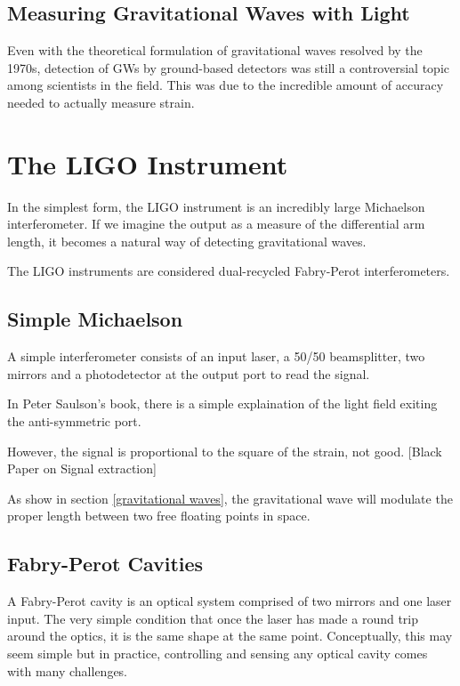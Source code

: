 \documentclass[oneside]{book}
\begin{document}
	\cite{Saulson}
	
	\subsection{Measuring Gravitational Waves with Light}
	Even with the theoretical formulation of gravitational waves resolved by the 1970s, detection of GWs by ground-based detectors was still a controversial topic among scientists in the field.  This was due to the incredible amount of accuracy needed to actually measure strain. 
	
	\section{The LIGO Instrument}
	In the simplest form, the LIGO instrument is an incredibly large Michaelson interferometer.  If we imagine the output as a measure of the differential arm length, it becomes a natural way of detecting gravitational waves.
	
	The LIGO instruments are considered dual-recycled Fabry-Perot interferometers.
	
		\subsection{Simple Michaelson}
		A simple interferometer consists of an input laser, a 50/50 beamsplitter, two mirrors and a photodetector at the output port to read the signal.
		
		In Peter Saulson's book, there is a simple explaination of the light field exiting the anti-symmetric port.
		
		However, the signal is proportional to the square of the strain, not good.
		[Black Paper on Signal extraction]
		
		As show in section \ref{gravitational waves}, the gravitational wave will modulate the proper length between two free floating points in space. 
	
		\subsection{Fabry-Perot Cavities}\label{FP}
		A Fabry-Perot cavity is an optical system comprised of two mirrors and one laser input. The very simple condition that once the laser has made a round trip around the optics, it is the same shape at the same point.  Conceptually, this may seem simple but in practice, controlling and sensing any optical cavity comes with many challenges.
\end{document}
